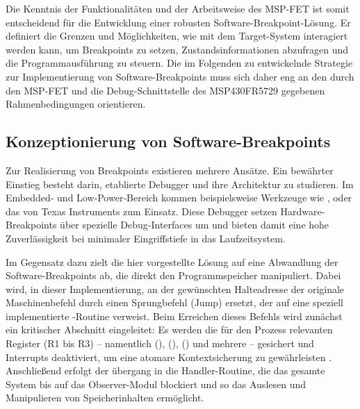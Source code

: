 Die Kenntnis der Funktionalit\"aten und der Arbeitsweise des MSP-FET ist somit entscheidend f\"ur die Entwicklung einer robusten Software-Breakpoint-L\"osung. Er definiert die Grenzen und M\"oglichkeiten, wie mit dem Target-System interagiert werden kann, um Breakpoints zu setzen, Zustandsinformationen abzufragen und die Programmausf\"uhrung zu steuern. Die im Folgenden zu entwickelnde Strategie zur Implementierung von Software-Breakpoints muss sich daher eng an den durch den MSP-FET und die Debug-Schnittstelle des MSP430FR5729 gegebenen Rahmenbedingungen orientieren.

\newpage
\subsection{Konzeptionierung von Software-Breakpoints}
\label{sec:KonzeptionierungSoftwareBreakpoints}

Zur Realisierung von Breakpoints existieren mehrere Ans\"atze. Ein bew\"ahrter Einstieg besteht darin, etablierte Debugger und ihre Architektur zu studieren. Im Embedded‑ und Low‑Power‑Bereich kommen beispielsweise Werkzeuge wie ,  oder das  von Texas Instruments zum Einsatz. Diese Debugger setzen Hardware-Breakpoints \"uber spezielle Debug‑Interfaces um und bieten damit eine hohe Zuverl\"assigkeit bei minimaler Eingriffstiefe in das Laufzeitsystem.

Im Gegensatz dazu zielt die hier vorgestellte L\"osung auf eine Abwandlung der Software-Breakpoints ab, die direkt den Programmspeicher manipuliert. Dabei wird, in dieser Implementierung, an der gew\"unschten Halteadresse der originale Maschinenbefehl durch einen Sprungbefehl (Jump) ersetzt, der auf eine speziell implementierte -Routine verweist. Beim Erreichen dieses Befehls wird zun\"achst ein kritischer Abschnitt eingeleitet: Es werden die f\"ur den Prozess relevanten Register (R1 bis R3) – namentlich  (),  (),  () und \ggf mehrere  – gesichert und Interrupts deaktiviert, um eine atomare Kontextsicherung zu gew\"ahrleisten . Anschlie{\ss}end erfolgt der \"ubergang in die Handler-Routine, die das gesamte System bis auf das Observer-Modul blockiert und so das Auslesen und Manipulieren von Speicherinhalten erm\"oglicht.

